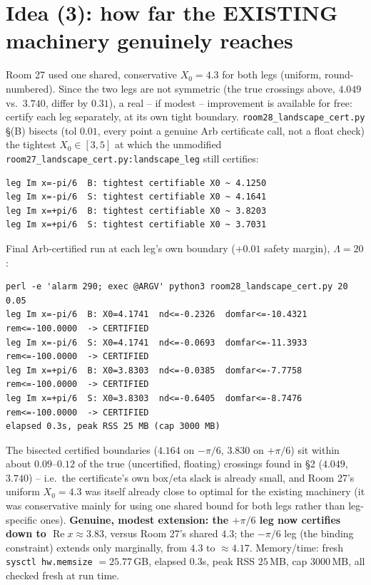 \documentclass[11pt]{article}
\begin{document}
\section{Idea (3): how far the EXISTING machinery genuinely reaches}
Room 27 used one shared, conservative $X_0=4.3$ for both legs (uniform, round-numbered). Since the two
legs are not symmetric (the true crossings above, $4.049$ vs.\ $3.740$, differ by $0.31$), a real -- if
modest -- improvement is available for free: certify each leg separately, at its own tight boundary.
\texttt{room28\_landscape\_cert.py} \S(B) bisects (tol $0.01$, every point a genuine Arb certificate call,
not a float check) the tightest $X_0\in[3,5]$ at which the unmodified \texttt{room27\_landscape\_cert.py:landscape\_leg}
still certifies:
\begin{verbatim}
leg Im x=-pi/6  B: tightest certifiable X0 ~ 4.1250
leg Im x=-pi/6  S: tightest certifiable X0 ~ 4.1641
leg Im x=+pi/6  B: tightest certifiable X0 ~ 3.8203
leg Im x=+pi/6  S: tightest certifiable X0 ~ 3.7031
\end{verbatim}
Final Arb-certified run at each leg's own boundary ($+0.01$ safety margin), $\Lambda=20$:
\begin{verbatim}
perl -e 'alarm 290; exec @ARGV' python3 room28_landscape_cert.py 20 0.05
leg Im x=-pi/6  B: X0=4.1741  nd<=-0.2326  domfar<=-10.4321  rem<=-100.0000  -> CERTIFIED
leg Im x=-pi/6  S: X0=4.1741  nd<=-0.0693  domfar<=-11.3933  rem<=-100.0000  -> CERTIFIED
leg Im x=+pi/6  B: X0=3.8303  nd<=-0.0385  domfar<=-7.7758   rem<=-100.0000  -> CERTIFIED
leg Im x=+pi/6  S: X0=3.8303  nd<=-0.6405  domfar<=-8.7476   rem<=-100.0000  -> CERTIFIED
elapsed 0.3s, peak RSS 25 MB (cap 3000 MB)
\end{verbatim}
The bisected certified boundaries ($4.164$ on $-\pi/6$, $3.830$ on $+\pi/6$) sit within about $0.09$--$0.12$
of the true (uncertified, floating) crossings found in \S2 ($4.049$, $3.740$) -- i.e.\ the certificate's
own box/eta slack is already small, and Room 27's uniform $X_0=4.3$ was itself already close to optimal
for the existing machinery (it was conservative mainly for using one shared bound for both legs rather than
leg-specific ones). \textbf{Genuine, modest extension: the $+\pi/6$ leg now certifies down to
$\operatorname{Re}x\approx3.83$}, versus Room 27's shared $4.3$; the $-\pi/6$ leg (the binding constraint)
extends only marginally, from $4.3$ to $\approx4.17$. Memory/time: fresh \texttt{sysctl hw.memsize}
$=25.77$\,GB, elapsed $0.3$s, peak RSS $25$\,MB, cap $3000$\,MB, all checked fresh at run time.
\end{document}
